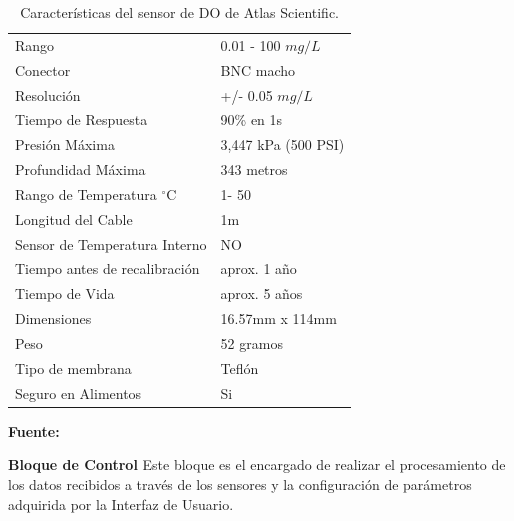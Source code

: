 \begin{table}[H]
\protect\caption[Caracter\'isticas del sensor de DO de Atlas Scientific]{Caracter\'isticas del sensor de DO de Atlas Scientific.}
\label{tab:caract_do}
\begin{center}
\begin{tabular}{l l}
\hline
Rango   &  0.01 - 100     $mg/L$         \\
Conector &  BNC macho                       \\
Resolución   &  +/-      0.05 $ mg/L$              \\
Tiempo de Respuesta   &  90\% en 1s         \\
Presión Máxima    &  3,447 kPa (500 PSI)    \\
Profundidad Máxima	& 343 metros            \\
Rango de Temperatura $^{\circ}$C	& 1- 50\\
Longitud del Cable	& 1m                    \\
Sensor de Temperatura Interno	& NO        \\
Tiempo antes de recalibración	& aprox. 1 año    \\
Tiempo de Vida	& aprox. 5 años            \\
Dimensiones	& 16.57mm x 114mm                  \\
Peso	& 52 gramos                         \\
Tipo de membrana	& Tefl\'on           \\
Seguro en Alimentos	& Si                    \\
\hline
\end{tabular}
\vspace{5mm}
\newline
\hfill \textbf{Fuente:} \cite{atlas_dissolved_DO}
\end{center}
\end{table}

\textbf{Bloque de Control}
Este bloque es el encargado de realizar el procesamiento de los datos recibidos a través de los sensores y la configuración de parámetros adquirida por la Interfaz de Usuario.

